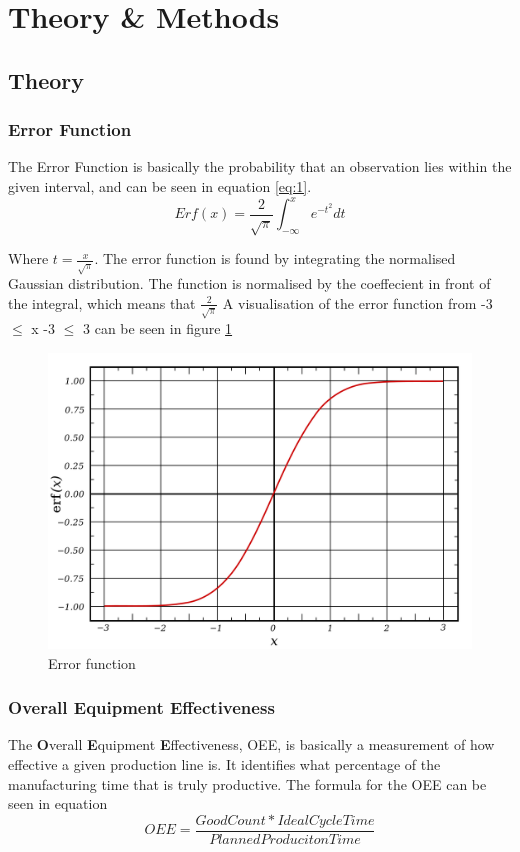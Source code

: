\section{Theory \& Methods}

\subsection{Theory}

\subsubsection{Error Function}
The Error Function is basically the probability that an observation lies within
the given interval, and can be seen in equation \ref{eq:1}.
\begin{equation} \label{eq:1}
    Erf(x)=\frac{2}{\sqrt{\pi}} \int_{-\infty}^x e^{-t^2} dt
\end{equation}

Where \(t=\frac{x}{\sqrt{\pi}}\). The error function is found by integrating
the normalised Gaussian distribution. The function is normalised by the
coeffecient in front of the integral, which means that \(\frac{2}{\sqrt{\pi}}\)
A visualisation of the error function from -3 $\leq$ x -3 $\leq$ 3 can be seen
in figure \ref{figure:error_function}

\begin{figure}[ht]
    \centering
    \includegraphics[scale=0.3]{images/error_function.png}
    \caption{Error function}
    \label{figure:error_function}
\end{figure}

\subsubsection{Overall Equipment Effectiveness}
The \textbf{O}verall \textbf{E}quipment \textbf{E}ffectiveness, OEE, is
basically a measurement of how effective a given production line is. It
identifies what percentage of the manufacturing time that is truly productive.
The formula for the OEE can be seen in equation 
\begin{equation} \label{eq:2}
    OEE = \frac{Good Count * Ideal Cycle Time}{Planned Produciton Time}
\end{equation}

